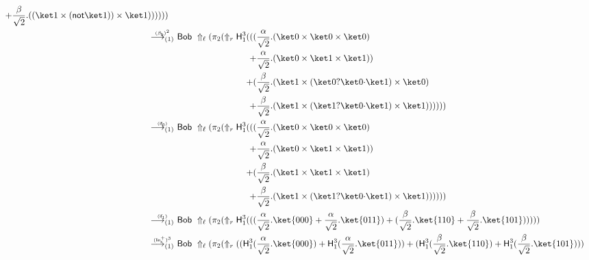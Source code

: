 \documentclass[preprint]{elsarticle}
\newcommand\lra[1][1]{\longrightarrow_{\left(#1\right)}}
\newcommand\ite[3]{{#1}?{#2}\mathord{\cdot}{#3}}
\newcommand\pair[2]{({#1}+{#2})}
\newcommand\s[1]{\ensuremath{\mathsf{#1}}}
\newcommand\red[2][1]{\overset{\scriptscriptstyle\smash{#2}\vphantom{x}}{\lra[#1]}\ }
\newcommand\rbetab{(\s{\beta_b})}
\newcommand\riftrue{(\s{if_{1}})}
\newcommand\riffalse{(\s{if_{0}})}
\newcommand\rlinr{(\s{lin^+_r})}
\begin{document}
\begin{align*}
\begin{aligned}[t]
                     +& {\frac{\beta}{\sqrt 2}.((\ket 1 \times (\s{not}\ket 1))
                       \times\ket 1)})))))
                   \end{aligned}
  \\
  \red{\rbetab^2} &
                    \begin{aligned}[t]
                      \s{Bob}\ \Uparrow_\ell(\pi_2(\Uparrow_r \s H_1^3( ((
                      &    \frac{\alpha}{\sqrt 2}.( \ket 0 \times \ket 0 \times \ket 0)\\
                      +& \frac{\alpha}{\sqrt 2}.( \ket 0 \times \ket 1 \times \ket 1))\\
                      + (& \frac{\beta}{\sqrt 2}.( \ket 1 \times (\ite{\ket 0}{\ket 0}{\ket 1}) \times \ket 0)\\
                      +& \frac{\beta}{\sqrt 2}.( \ket 1 \times (\ite{\ket
                        1}{\ket 0}{\ket 1}) \times \ket 1))))))
                    \end{aligned}
  \\
  \red{\riffalse} &
                    \begin{aligned}[t]
                      \s{Bob}\ \Uparrow_\ell(\pi_2(\Uparrow_r \s H_1^3( ((
                      &    \frac{\alpha}{\sqrt 2}.( \ket 0 \times \ket 0 \times \ket 0)\\
                      +& \frac{\alpha}{\sqrt 2}.( \ket 0 \times \ket 1 \times \ket 1))\\
                      + (& \frac{\beta}{\sqrt 2}.( \ket 1 \times \ket 1 \times \ket 1)\\
                      +& \frac{\beta}{\sqrt 2}.( \ket 1 \times (\ite{\ket
                        1}{\ket 0}{\ket 1}) \times \ket 1))))))
                    \end{aligned}
  \\
  \red{\riftrue} &
                   \s{Bob}\ \Uparrow_\ell(\pi_2(\Uparrow_r \s H_1^3(
                   \pair
                   {\pair{\frac{\alpha}{\sqrt 2}.\ket{000}}{\frac{\alpha}{\sqrt 2}.\ket{011}}}
                   {\pair{\frac{\beta}{\sqrt 2}.\ket{110}}{\frac{\beta}{\sqrt 2}.\ket{101}}}
                   )))
  \\
  \red{\rlinr^3} &
                   \s{Bob}\ \Uparrow_\ell(\pi_2(\Uparrow_r
                   \pair
                   {\pair{\s H_1^3(\frac{\alpha}{\sqrt 2}.\ket{000})}{\s H_1^3(\frac{\alpha}{\sqrt 2}.\ket{011})}}
                   {\pair{\s H_1^3(\frac{\beta}{\sqrt 2}.\ket{110})}{\s H_1^3(\frac{\beta}{\sqrt 2}.\ket{101})}}

\end{align*}
\end{document}
